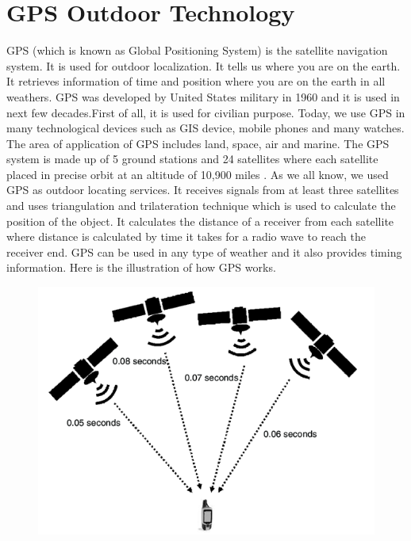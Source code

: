 \section{GPS Outdoor Technology}
GPS (which is known as Global Positioning System) is the satellite navigation system. It is used for outdoor localization. It tells us where you are on the earth. It retrieves information of time and position where you are on the earth in all weathers. GPS was developed by United States military in 1960 and it is used in next few decades.First of all, it is used for civilian purpose. Today, we use GPS in many technological devices such as GIS device, mobile phones and many watches. The area of application of GPS includes land, space, air and marine. The GPS system is made up of 5 ground stations and 24 satellites where each satellite placed in precise orbit at an altitude of 10,900 miles \cite{GPSworks}. As we all know, we used GPS as outdoor locating services. It receives signals from at least three satellites and uses triangulation and trilateration technique which is used to calculate the position of the object. It calculates the distance of a receiver from each satellite where distance is calculated by time it takes for a radio wave to reach the receiver end. GPS can be used in any type of weather and it also provides timing information. Here is the illustration of how GPS works.
\begin{figure}[h]
  		\centering
    		\includegraphics[scale=0.6]{./Figures/GPS}
 		\end{figure}
    
